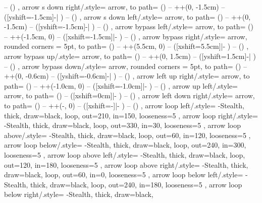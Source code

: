 {{{			-- (\tikztotarget)
		}
	},
	arrow s down right/.style={
		arrow,
		to path={
			(\tikztostart)
			-- ++(0, -1.5cm)
			-- ([yshift=-1.5cm]\tikztostart -| \tikztotarget)
			-- (\tikztotarget)
		}
	},
	arrow s down left/.style={
		arrow,
		to path={
			(\tikztostart)
			-- ++(0, -1.5cm)
			-- ([yshift=-1.5cm]\tikztostart -| \tikztotarget)
			-- (\tikztotarget)
		}
	},
	arrow bypass left/.style={
		arrow,
		to path={
			(\tikztostart)
			-- ++(-1.5cm, 0)
			-- ([xshift=-1.5cm]\tikztostart |- \tikztotarget)
			-- (\tikztotarget)
		}
	},
	arrow bypass right/.style={
		arrow, rounded corners = 5pt,
		to path={
			(\tikztostart)
			-- ++(5.5cm, 0)
			-- ([xshift=5.5cm]\tikztostart |- \tikztotarget)
			-- (\tikztotarget)
		}
	},
	arrow bypass up/.style={
		arrow,
		to path={
			(\tikztostart)
			-- ++(0, 1.5cm)
			-- ([yshift=1.5cm]\tikztostart -| \tikztotarget)
			-- (\tikztotarget)
		}
	},
	arrow bypass down/.style={
		arrow, rounded corners = 5pt,
		to path={
			(\tikztostart)
			-- ++(0, -0.6cm)
			-- ([yshift=-0.6cm]\tikztostart -| \tikztotarget)
			-- (\tikztotarget)
		}
	},
	arrow left up right/.style={
		arrow,
		to path={
			(\tikztostart)
			-- ++(-1.0cm, 0)
			-- ([xshift=-1.0cm]\tikztostart |- \tikztotarget)
			-- (\tikztotarget)
		}
	},
	arrow up left/.style={
		arrow,
			to path={
			(\tikztostart)
			-- ([xshift=0cm]\tikztostart |- \tikztotarget)
			-- (\tikztotarget)
		}
	},
	arrow left down right/.style={
		arrow,
		to path={
			(\tikztostart)
			-- ++(-, 0)
			-- ([xshift=-]\tikztostart |- \tikztotarget)
			-- (\tikztotarget)
		}
	},
	arrow loop left/.style={
		-Stealth, thick, draw=black,
		loop, out=210, in=150, looseness=5
	},
	arrow loop right/.style={
		-Stealth, thick, draw=black,
		loop, out=330, in=30, looseness=5
	},
	arrow loop above/.style={
		-Stealth, thick, draw=black,
		loop, out=60, in=120, looseness=5
	},
	arrow loop below/.style={
		-Stealth, thick, draw=black,
		loop, out=240, in=300, looseness=5
	},
	arrow loop above left/.style={
		-Stealth, thick, draw=black,
		loop, out=120, in=180, looseness=5
	},
	arrow loop above right/.style={
		-Stealth, thick, draw=black,
		loop, out=60, in=0, looseness=5
	},
	arrow loop below left/.style={
		-Stealth, thick, draw=black,
		loop, out=240, in=180, looseness=5
	},
	arrow loop below right/.style={
		-Stealth, thick, draw=black,
}}
